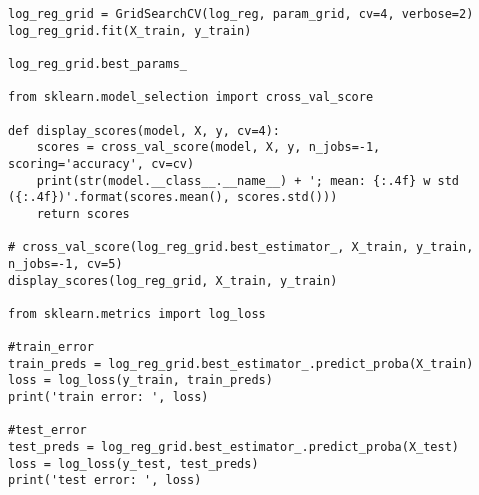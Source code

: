 \documentclass[12pt]{article}%
\begin{document}
\begin{lstlisting}
log_reg_grid = GridSearchCV(log_reg, param_grid, cv=4, verbose=2)
log_reg_grid.fit(X_train, y_train)

log_reg_grid.best_params_

from sklearn.model_selection import cross_val_score

def display_scores(model, X, y, cv=4):
    scores = cross_val_score(model, X, y, n_jobs=-1, scoring='accuracy', cv=cv)
    print(str(model.__class__.__name__) + '; mean: {:.4f} w std ({:.4f})'.format(scores.mean(), scores.std()))
    return scores

# cross_val_score(log_reg_grid.best_estimator_, X_train, y_train, n_jobs=-1, cv=5)
display_scores(log_reg_grid, X_train, y_train)

from sklearn.metrics import log_loss

#train_error
train_preds = log_reg_grid.best_estimator_.predict_proba(X_train)
loss = log_loss(y_train, train_preds)
print('train error: ', loss)

#test_error
test_preds = log_reg_grid.best_estimator_.predict_proba(X_test)
loss = log_loss(y_test, test_preds)
print('test error: ', loss)
\end{lstlisting}
\end{document}
